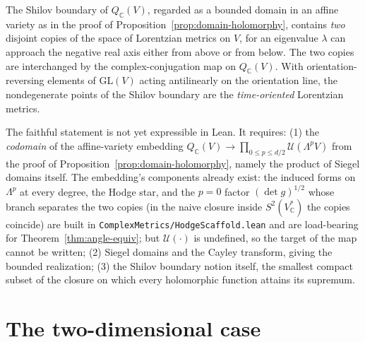 \begin{theorem}
  \label{thm:two-copies}
  \notready
  The Shilov boundary of $Q_{\mathbb C}(V)$, regarded as a bounded domain in
  an affine variety as in the proof of
  Proposition~\ref{prop:domain-holomorphy}, contains \emph{two} disjoint
  copies of the space of Lorentzian metrics on $V$, for an eigenvalue
  $\lambda$ can approach the negative real axis either from above or from
  below. The two copies are interchanged by the complex-conjugation map on
  $Q_{\mathbb C}(V)$. With orientation-reversing elements of
  $\mathrm{GL}(V)$ acting antilinearly on the orientation line, the
  nondegenerate points of the Shilov boundary are the \emph{time-oriented}
  Lorentzian metrics.

  The faithful statement is not yet expressible in Lean. It requires:
  (1) the \emph{codomain} of the affine-variety embedding
  $Q_{\mathbb C}(V) \to \prod_{0 \leq p \leq d/2} \mathcal U(\Lambda^p V)$
  from the proof of Proposition~\ref{prop:domain-holomorphy}, namely the
  product of Siegel domains itself. The embedding's components already
  exist: the induced forms on $\Lambda^p$ at every degree, the Hodge star,
  and the $p = 0$ factor $(\det g)^{1/2}$ whose branch separates the two
  copies (in the naive closure inside $S^2(V^*_{\mathbb C})$ the copies
  coincide) are built in \texttt{ComplexMetrics/HodgeScaffold.lean} and are
  load-bearing for Theorem~\ref{thm:angle-equiv}; but $\mathcal U(\cdot)$
  is undefined, so the target of the map cannot be written;
  (2) Siegel domains and the Cayley transform, giving the bounded
  realization; (3) the Shilov boundary notion itself, the smallest compact
  subset of the closure on which every holomorphic function attains its
  supremum.
\end{theorem}

\section{The two-dimensional case}


